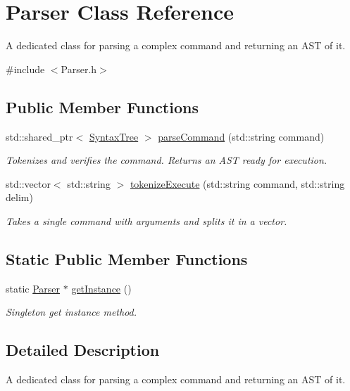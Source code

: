\hypertarget{classParser}{}\section{Parser Class Reference}
\label{classParser}


A dedicated class for parsing a complex command and returning an A\+ST of it.  




{\ttfamily \#include $<$Parser.\+h$>$}

\subsection*{Public Member Functions}
\begin{DoxyCompactItemize}
\item 
std\+::shared\+\_\+ptr$<$ \hyperlink{structSyntaxTree}{Syntax\+Tree} $>$ \hyperlink{classParser_a621be0eb716de9db8ecb77ec6afab3f0}{parse\+Command} (std\+::string command)
\begin{DoxyCompactList}\small\item\em Tokenizes and verifies the command. Returns an A\+ST ready for execution. \end{DoxyCompactList}\item 
std\+::vector$<$ std\+::string $>$ \hyperlink{classParser_a21451cb3011d796acf866b05d52601f3}{tokenize\+Execute} (std\+::string command, std\+::string delim)
\begin{DoxyCompactList}\small\item\em Takes a single command with arguments and splits it in a vector. \end{DoxyCompactList}\end{DoxyCompactItemize}
\subsection*{Static Public Member Functions}
\begin{DoxyCompactItemize}
\item 
static \hyperlink{classParser}{Parser} $\ast$ \hyperlink{classParser_a4f90468d5cc88a39d50dfc3f08b46ae0}{get\+Instance} ()
\begin{DoxyCompactList}\small\item\em Singleton get instance method. \end{DoxyCompactList}\end{DoxyCompactItemize}


\subsection{Detailed Description}
A dedicated class for parsing a complex command and returning an A\+ST of it. 

